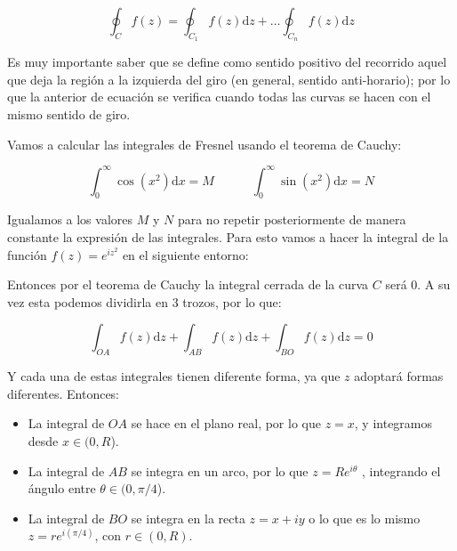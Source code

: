 \documentclass[12pt,a4paper]{book}
\newcommand{\D}{\mathrm{d}}
\newcommand{\tquad}{\quad  \quad \quad}
\begin{document}
\begin{equation}
\oint_C f(z) = \oint_{C_1} f(z) \D z + \ldots \oint_{C_n} f(z) \D z 
\end{equation}

Es muy importante saber que se define como sentido positivo del recorrido aquel que deja la región a la izquierda del giro (en general, sentido anti-horario); por lo que la anterior de ecuación se verifica cuando todas las curvas se hacen con el mismo sentido de giro. \\


\hrulefill

Vamos a calcular las integrales de Fresnel usando el teorema de Cauchy:

\begin{equation}
\int_{0}^{\infty} \cos (x^2) \D x = M \tquad 
\int_{0}^{\infty} \sin (x^2) \D x = N
\end{equation}


Igualamos a los valores $M$ y $N$ para no repetir posteriormente de manera constante la expresión de las integrales. Para esto vamos a hacer la integral de la función $f(z)=e^{iz^2}$ en el siguiente entorno:

\begin{figure}[h!] \centering
{}
\end{figure}

Entonces por el teorema de Cauchy la integral cerrada de la curva $C$ será 0. A su vez esta podemos dividirla en 3 trozos, por lo que:

$$ \int_{OA} f(z) \D z +  \int_{AB} f(z) \D z +  \int_{BO} f(z) \D z = 0  $$

Y cada una de estas integrales tienen diferente forma, ya que $z$ adoptará formas diferentes. Entonces:

\begin{itemize}
\item La integral de $OA$ se hace en el plano real, por lo que $z = x$, y integramos desde $x \in (0,R$).
\item La integral de $AB$ se integra en un arco, por lo que $z=Re^{i \theta}$ , integrando el ángulo entre $\theta \in (0, \pi/4$).
\item La integral de $BO$ se integra en la recta $z = x + iy$ o lo que es lo mismo $z=re^{i (\pi/4)}$, con $r \in (0,R)$.
\end{itemize}
\end{document}
